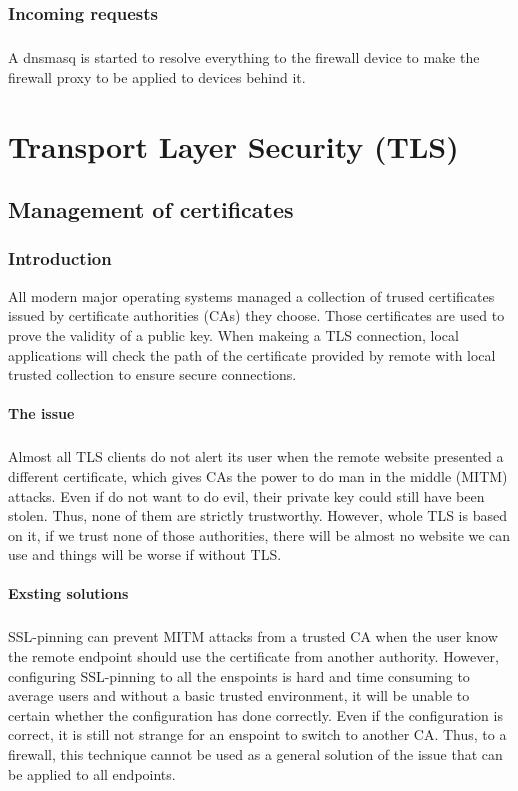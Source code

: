 \documentclass[mscthesis]{usiinfthesis}
\begin{document}
\subsection{Incoming requests}
\paragraph{}
A dnsmasq is started to resolve everything to the firewall device to make the firewall proxy to be applied to devices behind it.

\chapter{Transport Layer Security (TLS)}

\section{Management of certificates}

\subsection{Introduction}
All modern major operating systems managed a collection of trused certificates issued by certificate authorities (CAs) they choose. Those certificates are used to prove the validity of a public key. When makeing a TLS connection, local applications will check the path of the certificate provided by remote with local trusted collection to ensure secure connections.
\subsubsection{The issue}
\paragraph{}
Almost all TLS clients do not alert its user when the remote website presented a different certificate, which gives CAs the power to do man in the middle (MITM) attacks. Even if  do not want to do evil, their private key could still have been stolen. Thus, none of them are strictly trustworthy. However, whole TLS is based on it, if we trust none of those authorities, there will be almost no website we can use and things will be worse if without TLS.
\subsubsection{Exsting solutions}
\paragraph{}
SSL-pinning can prevent MITM attacks from a trusted CA when the user know the remote endpoint should use the certificate from another authority. However, configuring SSL-pinning to all the enspoints is hard and time consuming to average users and without a basic trusted environment, it will be unable to certain whether the configuration has done correctly. Even if the configuration is correct, it is still not strange for an enspoint to switch to another CA. Thus, to a firewall, this technique cannot be used as a general solution of the issue that can be applied to all endpoints.
\end{document}
